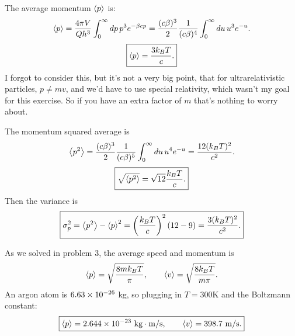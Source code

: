 \documentclass[12pt]{article}
\begin{document}
 The average momentum $\left \langle p \right \rangle$ is:
\[ \left \langle p \right \rangle = \frac{4\pi V}{Q h^3} \int_0^\infty dp\, p^3 e^{-\beta c p} = \frac{(c\beta)^3}{2} \frac{1}{(c\beta)^4} \int_0^\infty du\, u^3 e^{-u}.\]
\[ \boxed{ \left \langle p \right \rangle = \frac{3k_BT}{c}.}\]
I forgot to consider this, but it's not a very big point, that for ultrarelativistic particles, $p \neq mv$, and we'd have to use special relativity, which wasn't my goal for this exercise. So if you have an extra factor of $m$ that's nothing to worry about.

 The momentum squared average is
\[ \left \langle p^2 \right \rangle = \frac{(c\beta)^3}{2} \frac{1}{(c\beta)^5} \int_0^\infty du \, u^4 e^{-u} = \frac{12(k_BT)^2}{c^2}.\]
\[ \boxed{ \sqrt{\left \langle p^2 \right \rangle} = \sqrt{12}\frac{k_BT}{c}.}\]
Then the variance is
\[\boxed{ \sigma^2_p = \left \langle p^2 \right \rangle - \left \langle p \right \rangle^2 = \left(\frac{k_BT}{c}\right)^2\left(12 - 9\right) = \frac{3(k_BT)^2}{c^2}.}\]

\hrulefill

 As we solved in problem 3, the average speed and momentum is
\[ \left \langle p \right \rangle = \sqrt{\frac{8 m k_BT}{\pi}},\qquad \left \langle v \right \rangle = \sqrt{\frac{8k_BT}{m\pi}}.\]
An argon atom is $6.63\times10^{-26}$ kg, so plugging in $T=300$K and the Boltzmann constant:
\[ \boxed{ \left \langle p \right \rangle = 2.644\times10^{-23} \mathrm{~kg\cdot m/s},\qquad \left \langle v \right \rangle = 398.7\mathrm{~m/s} .}\]
\end{document}
